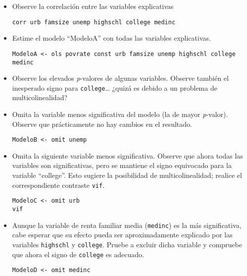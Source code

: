 \documentclass[11pt]{article}
\begin{document}
\begin{itemize}
\item Observe la correlación entre las variables explicativas
{\vspace{0pt} \color{gray!70!black}
\begin{verbatim}
corr urb famsize unemp highschl college medinc
\end{verbatim}
}

\item Estime el modelo ``ModeloA'' con todas las variables explicativas.
{\vspace{0pt} \color{gray!70!black}
\begin{verbatim}
ModeloA <- ols povrate const urb famsize unemp highschl college medinc
\end{verbatim}
}

\item Observe los elevados \emph{p}-valores de algunas variables. Observe
también el inesperado signo para \texttt{college}\dots{} ¿quizá es debido a
un problema de multicolinealidad?

\item Omita la variable menos significativa del modelo (la de mayor
\emph{p}-valor). Observe que prácticamente no hay cambios en el
resultado.
{\vspace{0pt} \color{gray!70!black}
\begin{verbatim}
ModeloB <- omit unemp
\end{verbatim}
}

\item Omita la siguiente variable menos significativa. Observe que ahora
todas las variables son significativas, pero se mantiene el signo
equivocado para la variable ``college''.  Esto sugiere la
posibilidad de multicolinealidad; realice el correspondiente
contraste \texttt{vif}.
{\vspace{0pt} \color{gray!70!black}
\begin{verbatim}
ModeloC <- omit urb
vif
\end{verbatim}
}

\item Aunque la variable de renta familiar media (\texttt{medinc}) es la más
significativa, cabe esperar que su efecto pueda ser aproximadamente
explicado por las variables \texttt{highschl} y \texttt{college}. Pruebe a excluir
dicha variable y compruebe que ahora el signo de \texttt{college} es
adecuado.
{\vspace{0pt} \color{gray!70!black}
\begin{verbatim}
ModeloD <- omit medinc
\end{verbatim}
}


\end{itemize}
\end{document}
